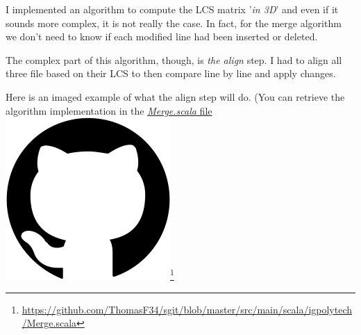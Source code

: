 \documentclass[11pt]{article}
\begin{document}
I implemented an algorithm to compute the LCS matrix '\textit{in 3D}' and even if it sounds more complex, it is not really the case. In fact, for the merge algorithm we don't need to know if each modified line had been inserted or deleted.

The complex part of this algorithm, though, is \textit{the align} step. I had to align all three file based on their LCS to then compare line by line and apply changes.

Here is an imaged example of what the align step will do. (You can retrieve the algorithm implementation in the \href{https://github.com/ThomasF34/sgit/blob/master/src/main/scala/igpolytech/Merge.scala}{\textit{Merge.scala} file \includegraphics[height=\fontcharht\font`\l]{img/github.png}}\footnote{\href{https://github.com/ThomasF34/sgit/blob/master/src/main/scala/igpolytech/Merge.scala}{\ul{https://github.com/ThomasF34/sgit/blob/master/src/main/scala/igpolytech/Merge.scala}}}
\end{document}
